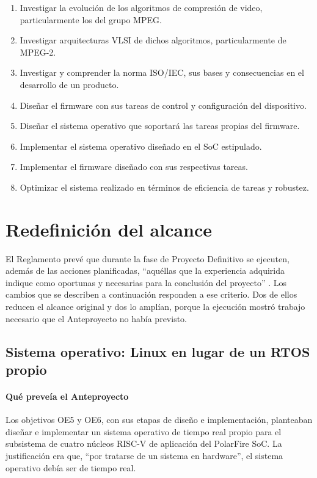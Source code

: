 \begin{enumerate}[label=OE\arabic*., leftmargin=3.2em]
  \item Investigar la evolución de los algoritmos de compresión de video,
    particularmente los del grupo MPEG.
  \item Investigar arquitecturas VLSI de dichos algoritmos, particularmente
    de MPEG-2.
  \item Investigar y comprender la norma ISO/IEC, sus bases y consecuencias
    en el desarrollo de un producto.
  \item Diseñar el firmware con sus tareas de control y configuración del
    dispositivo.
  \item Diseñar el sistema operativo que soportará las tareas propias del
    firmware.
  \item Implementar el sistema operativo diseñado en el SoC estipulado.
  \item Implementar el firmware diseñado con sus respectivas tareas.
  \item Optimizar el sistema realizado en términos de eficiencia de tareas y
    robustez.
\end{enumerate}

\section{Redefinición del alcance}
\label{sec:redefinicion-alcance}

El Reglamento prevé que durante la fase de Proyecto Definitivo se ejecuten,
además de las acciones planificadas, \enquote{aquéllas que la experiencia
adquirida indique como oportunas y necesarias para la conclusión del
proyecto} \citep[punto 2.3]{UTN_FRLR_2023_reglamento}. Los cambios que se
describen a continuación responden a ese criterio. Dos de ellos reducen el
alcance original y dos lo amplían, porque la ejecución mostró trabajo
necesario que el Anteproyecto no había previsto.

\subsection{Sistema operativo: Linux en lugar de un RTOS propio}
\label{sec:redef-so}

\paragraph{Qué preveía el Anteproyecto}
Los objetivos OE5 y OE6, con sus etapas de diseño e implementación, planteaban
diseñar e implementar un sistema operativo de tiempo real propio para el
subsistema de cuatro núcleos RISC-V de aplicación del PolarFire SoC. La
justificación era que, \enquote{por tratarse de un sistema en hardware}, el
sistema operativo debía ser de tiempo real.

